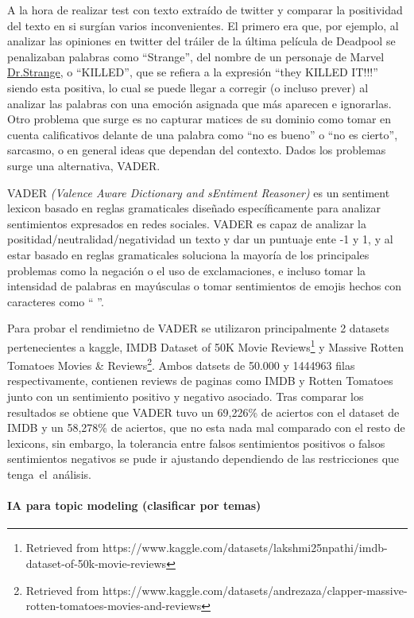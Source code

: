 \documentclass[
  letterpaper,
  DIV=11,
  numbers=noendperiod]{scrartcl}
\let\oldparagraph\paragraph
\renewcommand{\paragraph}[1]{\oldparagraph{#1}\mbox{}}
\begin{document}
A la hora de realizar test con texto extraído de twitter y comparar la
positividad del texto en si surgían varios inconvenientes. El primero
era que, por ejemplo, al analizar las opiniones en twitter del tráiler
de la última película de Deadpool se penalizaban palabras como
``Strange'', del nombre de un personaje de Marvel
\underline{Dr.Strange}, o ``KILLED'', que se refiera a la expresión
``they KILLED IT!!!'' siendo esta positiva, lo cual se puede llegar a
corregir (o incluso prever) al analizar las palabras con una emoción
asignada que más aparecen e ignorarlas. Otro problema que surge es no
capturar matices de su dominio como tomar en cuenta calificativos
delante de una palabra como ``no es bueno'' o ``no es cierto'',
sarcasmo, o en general ideas que dependan del contexto. Dados los
problemas surge una alternativa, VADER.

VADER \emph{(Valence Aware Dictionary and sEntiment Reasoner)} es un
sentiment lexicon basado en reglas gramaticales diseñado específicamente
para analizar sentimientos expresados en redes sociales. VADER es capaz
de analizar la positidad/neutralidad/negatividad un texto y dar un
puntuaje ente -1 y 1, y al estar basado en reglas gramaticales soluciona
la mayoría de los principales problemas como la negación o el uso de
exclamaciones, e incluso tomar la intensidad de palabras en mayúsculas o
tomar sentimientos de emojis hechos con caracteres como `` \text{:(} ''.

Para probar el rendimietno de VADER se utilizaron principalmente 2
datasets pertenecientes a kaggle, IMDB Dataset of 50K Movie
Reviews\footnote{Retrieved from
https://www.kaggle.com/datasets/lakshmi25npathi/imdb-dataset-of-50k-movie-reviews
} y Massive Rotten Tomatoes Movies \&
Reviews\footnote{Retrieved from https://www.kaggle.com/datasets/andrezaza/clapper-massive-rotten-tomatoes-movies-and-reviews}.
Ambos datsets de 50.000 y 1444963 filas respectivamente, contienen
reviews de paginas como IMDB y Rotten Tomatoes junto con un sentimiento
positivo y negativo asociado. Tras comparar los resultados se obtiene
que VADER tuvo un 69,226\% de aciertos con el dataset de IMDB y un
58,278\% de aciertos, que no esta nada mal comparado con el resto de
lexicons, sin embargo, la tolerancia entre falsos sentimientos positivos
o falsos sentimientos negativos se pude ir ajustando dependiendo de las
restricciones que tenga~el~análisis.

\paragraph{IA para topic modeling (clasificar por
temas)}\label{ia-para-topic-modeling-clasificar-por-temas}
\end{document}
